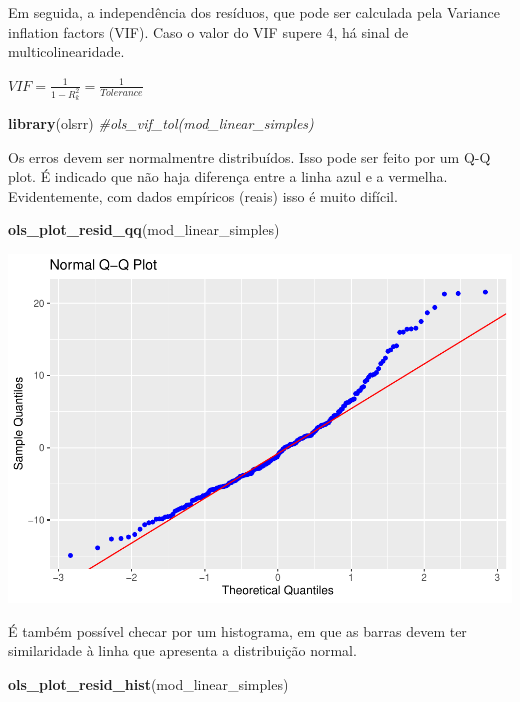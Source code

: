 \documentclass[
]{book}
\newenvironment{Shaded}{\begin{snugshade}}{\end{snugshade}}
\newcommand{\CommentTok}[1]{\textcolor[rgb]{0.56,0.35,0.01}{\textit{#1}}}
\newcommand{\KeywordTok}[1]{\textcolor[rgb]{0.13,0.29,0.53}{\textbf{#1}}}
\newcommand{\NormalTok}[1]{#1}
\begin{document}
Em seguida, a independência dos resíduos, que pode ser calculada pela Variance inflation factors (VIF). Caso o valor do VIF supere 4, há sinal de multicolinearidade.

\(VIF = \frac{1}{1 - {R}^{2}_{k}} = \frac{1}{Tolerance}\)

\begin{Shaded}
\begin{Highlighting}[]
\KeywordTok{library}\NormalTok{(olsrr)}
\CommentTok{#ols_vif_tol(mod_linear_simples)}
\end{Highlighting}
\end{Shaded}

Os erros devem ser normalmentre distribuídos. Isso pode ser feito por um Q-Q plot. É indicado que não haja diferença entre a linha azul e a vermelha. Evidentemente, com dados empíricos (reais) isso é muito difícil.

\begin{Shaded}
\begin{Highlighting}[]
\KeywordTok{ols_plot_resid_qq}\NormalTok{(mod_linear_simples)}
\end{Highlighting}
\end{Shaded}

\begin{center}\includegraphics{gitbook-demo_files/figure-latex/unnamed-chunk-104-1} \end{center}

É também possível checar por um histograma, em que as barras devem ter similaridade à linha que apresenta a distribuição normal.

\begin{Shaded}
\begin{Highlighting}[]
\KeywordTok{ols_plot_resid_hist}\NormalTok{(mod_linear_simples)}
\end{Highlighting}
\end{Shaded}
\end{document}
